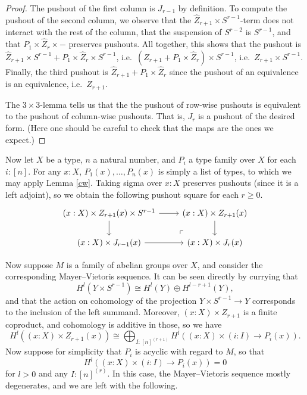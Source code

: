 \begin{proof}
The pushout of the first column is $J_{r-1}$ by definition.
To compute the pushout of the second column, we observe that the 
$\widehat Z_{r+1} \times S^{r-1}$-term does not interact with the rest of the column,
that the suspension of $S^{r-2}$ is $S^{r-1}$, and that $P_1 \times \widehat Z_r \times -$
preserves pushouts. All together, this shows that
the pushout is $\widehat Z_{r+1} \times S^{r-1} + P_1 \times \widehat Z_r \times S^{r-1}$,
i.e.\ $(\widehat Z_{r+1} + P_1 \times \widehat Z_r) \times S^{r-1}$,
i.e.\ $Z_{r+1} \times S^{r-1}$.
Finally, the third pushout is 
$\widehat Z_{r+1} + P_1 \times \widehat Z_r$ since the pushout of an equivalence
is an equivalence, i.e.\ $Z_{r+1}$.

The $3 \times 3$-lemma tells us that the the pushout of row-wise pushouts is equivalent
to the pushout of column-wise pushouts. That is, 
$J_r$ is a pushout of the desired form. (Here one should be careful to
		check that the maps are the ones we expect.)
\end{proof}

Now let $X$ be a type, $n$ a natural number, and $P_i$ a type family over
$X$ for each $i : [n]$. For any $x : X$,
$P_1(x), \ldots, P_n(x)$ is simply a list of types, to which we may apply
Lemma \ref{cw}.
Taking sigma over $x : X$ preserves pushouts (since it is a left adjoint),
	   so we obtain the following pushout square for each $r \ge 0$.
\[
\begin{tikzcd}
(x : X) \times Z_{r+1}(x) \times S^{r-1} \arrow[r] \arrow[d]
	& (x : X) \times Z_{r+1}(x) \arrow[d] \\
	(x : X) \times J_{r-1}(x) \arrow[r] &
	(x : X) \times J_r(x)
	\arrow[ul, phantom, "\ulcorner" , very near start]
\end{tikzcd}
\]

Now suppose $M$ is a family of abelian groups over $X$,
and consider the
corresponding Mayer--Vietoris sequence.
It can be seen directly by currying that
\[H^l(Y \times S^{r-1})
	\cong 
H^l(Y) \oplus
H^{l-r+1}(Y),\]
and that the action on cohomology of the projection $Y \times S^{r-1} \to Y$
corresponds to the inclusion of the left summand.
Moreover, $(x : X) \times Z_{r+1}$ is a finite coproduct, and
cohomology is additive in those, so we have
\[H^l((x : X) \times Z_{r+1}(x))
	\cong
	\bigoplus_{I : [n]^{(r+1)}} H^l((x : X) \times (i : I) \to P_i(x)).\]
Now suppose for simplicity that $P_i$ is acyclic with regard to $M$, so 
that \[H^l((x : X) \times (i: I) \to P_i(x)) = 0\] for $l > 0$ and any
$I : [n]^{(r)}$.
In this case, the Mayer--Vietoris sequence mostly degenerates, and
we are left with the following.

